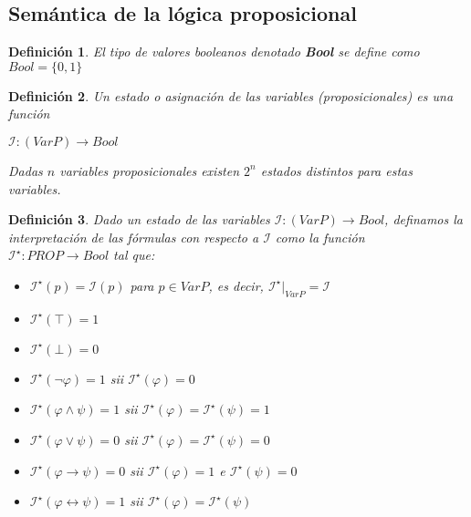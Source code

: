 \documentclass[letterpaper,11pt]{article}
\newtheorem{define}{Definición}[]
\begin{document}
    \subsection{Semántica de la lógica proposicional}
    \begin{define} 
        El tipo de valores booleanos denotado \textbf{Bool} se define
        como $Bool = \{0, 1 \}$
    \end{define}
    \begin{define}
        Un estado o asignación de las variables (proposicionales) es una 
        función 
        \begin{center}
            $\mathcal{I} : (Var P) \rightarrow Bool$
        \end{center}
        Dadas $n$ variables proposicionales existen $2^{n}$ estados 
        distintos para estas variables.
    \end{define}
    \begin{define}
        Dado un estado de las variables 
        $\mathcal{I} : (Var P) \rightarrow Bool$, definamos la interpretación
        de las fórmulas con respecto a $\mathcal{I}$ como la función 
        $\mathcal{I^{\star}} : PROP \rightarrow Bool$ tal que: 
        \begin{itemize}
            \item $\mathcal{I^{\star}}(p) = \mathcal{I}(p)$ para 
            $p \in Var P$, es decir, 
            $\mathcal{I^{\star}}|_{Var P} = \mathcal{I}$
            \item $\mathcal{I^{\star}}(\top) = 1$
            \item $\mathcal{I^{\star}}(\bot) = 0$
            \item $\mathcal{I^{\star}}(\neg \varphi) = 1$ sii 
            $\mathcal{I^{\star}}(\varphi) = 0$
            \item $\mathcal{I^{\star}}(\varphi \land \psi) = 1$
            sii $\mathcal{I^{\star}}(\varphi) = \mathcal{I^{\star}}(\psi) = 1$
            \item $\mathcal{I^{\star}}(\varphi \lor \psi) = 0$
            sii $\mathcal{I^{\star}}(\varphi) = 
            \mathcal{I^{\star}}(\psi) = 0$
            \item $\mathcal{I^{\star}}(\varphi \rightarrow \psi) = 0$
            sii $\mathcal{I^{\star}}(\varphi) = 1$ e
            $\mathcal{I^{\star}}(\psi) = 0$
            \item $\mathcal{I^{\star}}(\varphi \leftrightarrow \psi) = 1$
            sii $\mathcal{I^{\star}}(\varphi) = \mathcal{I^{\star}}(\psi)$
        \end{itemize}
    \end{define}
\end{document}
